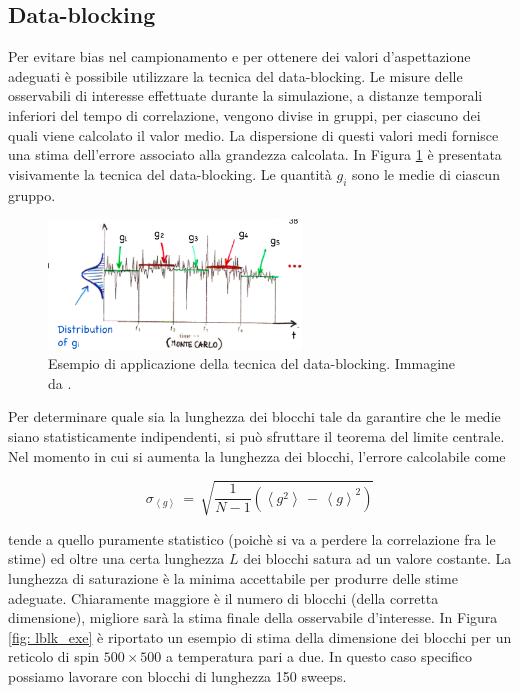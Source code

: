 \subsection{Data-blocking}

Per evitare bias nel campionamento e per ottenere dei valori d'aspettazione adeguati è possibile utilizzare la tecnica del 
data-blocking. Le misure delle osservabili di interesse effettuate durante la simulazione, a distanze temporali inferiori del tempo di correlazione, 
vengono divise in gruppi, per ciascuno dei quali viene calcolato il valor medio. La dispersione di questi valori medi fornisce una 
stima dell'errore associato alla grandezza calcolata. In Figura \ref{fig: data_block_tech} è presentata visivamente la tecnica del 
data-blocking. Le quantità $g_i$ sono le medie di ciascun gruppo.

\begin{figure}[H]
    \centering
    \includegraphics[width=0.6\textwidth]{Immagini/data_blocking.png}
    \caption{Esempio di applicazione della tecnica del data-blocking. Immagine da \cite{galliLSN}.}
    \label{fig: data_block_tech}
\end{figure}

Per determinare quale sia la lunghezza dei blocchi tale da garantire che le medie siano statisticamente indipendenti, si può 
sfruttare il teorema del limite centrale. Nel momento in cui si aumenta la lunghezza dei blocchi, l'errore calcolabile come 

\begin{equation}
    \sigma_{\left<g\right>}\,=\,\sqrt{\frac{1}{N-1}\left(\left<g^2\right>\,-\,\left<g\right>^2\right)}
    \label{eq: error_data_block}
\end{equation}

tende a quello puramente statistico (poichè si va a perdere la correlazione fra le stime) ed oltre una certa lunghezza $L$ dei blocchi 
satura ad un valore costante. La lunghezza di saturazione è la minima accettabile per produrre delle stime adeguate. 
Chiaramente maggiore è il numero di blocchi (della corretta dimensione), migliore sarà la stima finale della osservabile 
d'interesse. In Figura \ref{fig: lblk_exe} è riportato un esempio di stima della dimensione dei blocchi per un reticolo di spin 
$500 \times 500$ a temperatura pari a due. In questo caso specifico possiamo lavorare con blocchi di lunghezza 150 sweeps.

